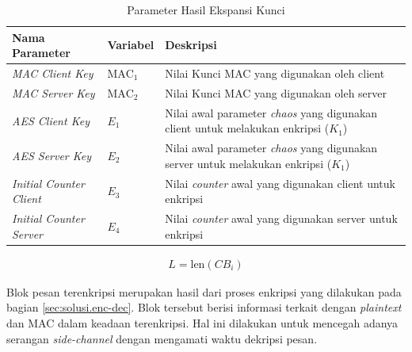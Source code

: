 \begin{table}[!h]
  \centering
  \caption{Parameter Hasil Ekspansi Kunci} \label{tab:tls.keyexpansion}
  \begin{tabular}{|p{3cm}|p{3cm}|p{6cm}|}
    \hline
    \textbf{Nama Parameter} & \textbf{Variabel} & \textbf{Deskripsi} \\
    \hline
    \emph{MAC Client Key} & $\text{MAC}_1$ & Nilai Kunci MAC yang digunakan oleh client \\ \hline
    \emph{MAC Server Key} & $\text{MAC}_2$ & Nilai Kunci MAC yang digunakan oleh server \\ \hline
    \emph{AES Client Key}  & $E_1$ & Nilai awal  parameter \emph{chaos} yang digunakan client untuk melakukan enkripsi ($K_1$) \\ \hline
    \emph{AES Server Key}  & $E_2$ & Nilai awal parameter \emph{chaos} yang digunakan server untuk melakukan enkripsi ($K_1$) \\ \hline
    \emph{Initial Counter Client}  & $E_3$ & Nilai \emph{counter} awal yang digunakan client untuk enkripsi \\ \hline
    \emph{Initial Counter Server}  & $E_4$ & Nilai \emph{counter} awal yang digunakan server untuk enkripsi \\
    \hline
  \end{tabular}
\end{table}


\begin{equation}
  \begin{aligned}
    L = \text{len}(CB_{i})
  \end{aligned}
  \label{eq:tls.record.length}
\end{equation}

Blok pesan terenkripsi merupakan hasil dari proses enkripsi yang dilakukan pada bagian \ref{sec:solusi.enc-dec}. Blok tersebut berisi informasi terkait dengan \emph{plaintext} dan MAC dalam keadaan terenkripsi. Hal ini dilakukan untuk mencegah adanya serangan \emph{side-channel} dengan mengamati waktu dekripsi pesan.

